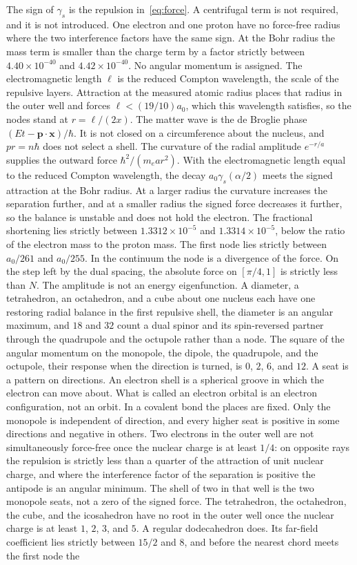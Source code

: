 \documentclass[a4paper]{article}
\begin{document}
The sign of \(\gamma_s\) is the repulsion in~\eqref{eq:force}. A centrifugal term is not required, and it is not introduced. One electron and one proton have no force-free radius where the two interference factors have the same sign. At the Bohr radius the mass term is smaller than the charge term by a factor strictly between \(4.40\times 10^{-40}\) and \(4.42\times 10^{-40}\). No angular momentum is assigned. The electromagnetic length \(\ell\) is the reduced Compton wavelength, the scale of the repulsive layers. Attraction at the measured atomic radius places that radius in the outer well and forces \(\ell<(19/10)a_0\), which this wavelength satisfies, so the nodes stand at \(r=\ell/(2x)\). The matter wave is the de Broglie phase \((Et-\mathbf{p}\cdot\mathbf{x})/\hbar\). It is not closed on a circumference about the nucleus, and \(pr=n\hbar\) does not select a shell. The curvature of the radial amplitude \(e^{-r/a}\) supplies the outward force \(\hbar^{2}/(m_e a r^{2})\). With the electromagnetic length equal to the reduced Compton wavelength, the decay \(a_0\gamma_s(\alpha/2)\) meets the signed attraction at the Bohr radius. At a larger radius the curvature increases the separation further, and at a smaller radius the signed force decreases it further, so the balance is unstable and does not hold the electron. The fractional shortening lies strictly between \(1.3312\times 10^{-5}\) and \(1.3314\times 10^{-5}\), below the ratio of the electron mass to the proton mass. The first node lies strictly between \(a_0/261\) and \(a_0/255\). In the continuum the node is a divergence of the force. On the step left by the dual spacing, the absolute force on \([\pi/4,1]\) is strictly less than \(N\). The amplitude is not an energy eigenfunction. A diameter, a tetrahedron, an octahedron, and a cube about one nucleus each have one restoring radial balance in the first repulsive shell, the diameter is an angular maximum, and \(18\) and \(32\) count a dual spinor and its spin-reversed partner through the quadrupole and the octupole rather than a node. The square of the angular momentum on the monopole, the dipole, the quadrupole, and the octupole, their response when the direction is turned, is \(0\), \(2\), \(6\), and \(12\). A seat is a pattern on directions. An electron shell is a spherical groove in which the electron can move about. What is called an electron orbital is an electron configuration, not an orbit. In a covalent bond the places are fixed. Only the monopole is independent of direction, and every higher seat is positive in some directions and negative in others. Two electrons in the outer well are not simultaneously force-free once the nuclear charge is at least \(1/4\): on opposite rays the repulsion is strictly less than a quarter of the attraction of unit nuclear charge, and where the interference factor of the separation is positive the antipode is an angular minimum. The shell of two in that well is the two monopole seats, not a zero of the signed force. The tetrahedron, the octahedron, the cube, and the icosahedron have no root in the outer well once the nuclear charge is at least \(1\), \(2\), \(3\), and \(5\). A regular dodecahedron does. Its far-field coefficient lies strictly between \(15/2\) and \(8\), and before the nearest chord meets the first node the 
\end{document}
